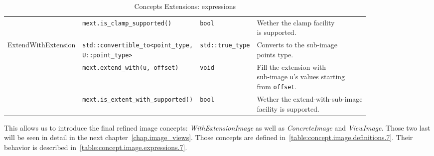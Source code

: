 \begin{table}[!htbp]
\begin{scriptsize}
\begin{tabular}{llll}
      \multicolumn{1}{c|}{}                                        & \texttt{mext.is\_clamp\_supported()}          &
      \texttt{bool}                                                & \makecell[l]{Wether the clamp facility                                                    \\is supported.}                                       \\
      \cline{1-4}
      \multicolumn{1}{c|}{\multirow{3}{*}{ExtendWithExtension}}    &
      \makecell[l]{\texttt{std::convertible\_to<point\_type,}                                                                                                  \\\texttt{U::point\_type>}} & \texttt{std::true\_type} &
      \makecell[l]{Converts to the sub-image                                                                                                                   \\ points type.}                                                                                                       \\
      \multicolumn{1}{c|}{}                                        & \texttt{mext.extend\_with(u, offset)}         &
      \texttt{void}                                                & \makecell[l]{Fill the extension with                                                      \\sub-image      \texttt{u}'s values  starting \\ from \texttt{offset}.} \\
      \multicolumn{1}{c|}{}                                        & \texttt{mext.is\_extent\_with\_supported()}   &
      \texttt{bool}                                                & \makecell[l]{Wether the extend-with-sub-image                                             \\ facility is
      supported.}                                                                                                                                              \\
      \cline{1-4}
    \end{tabular}
    \smallskip

    \caption{Concepts Extensions: expressions}
  \end{scriptsize}
  \label{table:concept.extensions.expressions}
\end{table}


This allows us to introduce the final refined image concepts: \emph{WithExtensionImage} as well as \emph{ConcreteImage}
and \emph{ViewImage}. Those two last will be seen in detail in the next chapter~\ref{chap.image_views}. Those concepts
are defined in~\cref{table:concept.image.definitions.7}. Their behavior is described
in~\cref{table:concept.image.expressions.7}.

